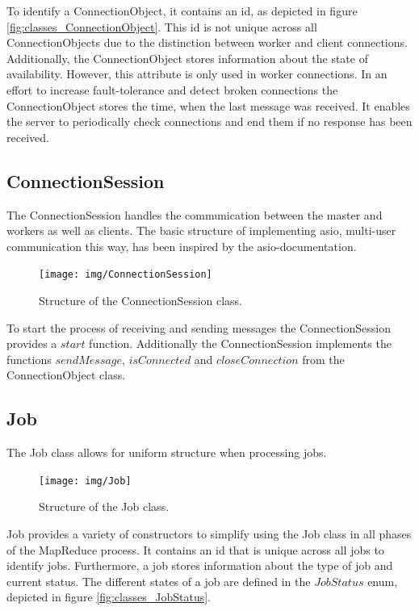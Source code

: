 \documentclass[12pt, letterpaper]{article}
\begin{document}
To identify a ConnectionObject, it contains an id, as depicted in figure \ref{fig:classes_ConnectionObject}. This id is not unique across all ConnectionObjects due to the distinction between worker and client connections. Additionally, the ConnectionObject stores information about the state of availability. However, this attribute is only used in worker connections.\newline
In an effort to increase fault-tolerance and detect broken connections the ConnectionObject stores the time, when the last message was received. It enables the server to periodically check connections and end them if no response has been received.

\subsection{ConnectionSession}

The ConnectionSession handles the communication between the master and workers as well as clients.
The basic structure of implementing asio, multi-user communication this way, has been inspired by the asio-documentation.

\begin{figure}[h]
	\centering
	\texttt{[image: img/ConnectionSession]}
	\caption{Structure of the ConnectionSession class.}
	\label{fig:classes_ConnectionSession}
\end{figure}

To start the process of receiving and sending messages the ConnectionSession provides a $start$ function. Additionally the ConnectionSession implements the functions $sendMessage$, $isConnected$ and $closeConnection$ from the ConnectionObject class.  

\pagebreak
\subsection{Job}

The Job class allows for uniform structure when processing jobs.

\begin{figure}[h]
	\centering
	\texttt{[image: img/Job]}
	\caption{Structure of the Job class.}
	\label{fig:classes_Job}
\end{figure}

Job provides a variety of constructors to simplify using the Job class in all phases of the MapReduce process. It contains an id that is unique across all jobs to identify jobs. Furthermore, a job stores information about the type of job and current status. The different states of a job are defined in the $JobStatus$ enum, depicted in figure \ref{fig:classes_JobStatus}.
\end{document}
